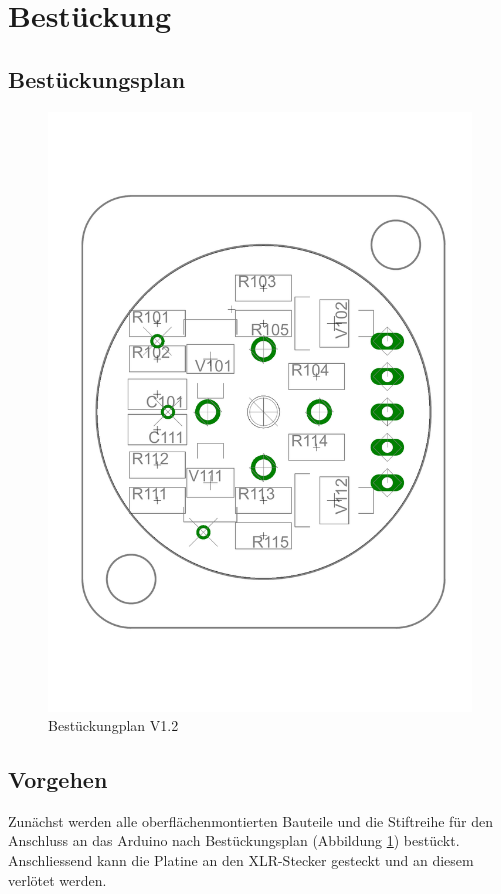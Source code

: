 
\section{Bestückung}

\subsection{Bestückungsplan}
\begin{figure}[h!]
	\centering
	\includegraphics[scale=\layscale]{fig/xlr_pegelwandler_v_1_2_best_eagle.pdf}
	\caption{Bestückungplan V1.2}
	\label{fig:best}
\end{figure}


\subsection{Vorgehen}
Zunächst werden alle oberflächenmontierten Bauteile und die Stiftreihe für den 
Anschluss an das Arduino nach Bestückungsplan (Abbildung \ref{fig:best}) 
bestückt. Anschliessend kann die Platine an den XLR-Stecker gesteckt und an 
diesem verlötet werden. 